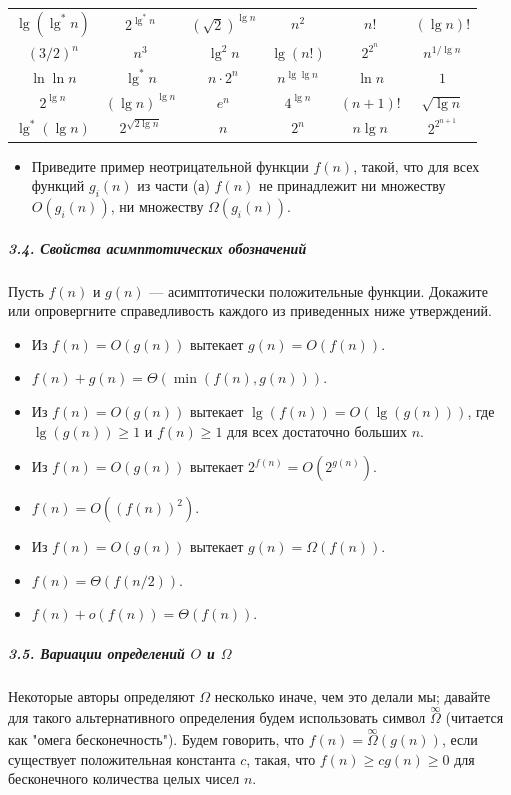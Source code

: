 \begin{center}
\begin{tabular}{cccccc}
$\lg(\lg^* n)$ & $2^{\lg^* n}$ & $(\sqrt{2})^{\lg n}$ & $n^2$ & $n!$ & $(\lg n)!$ \\
$(3/2)^n$ & $n^3$ & $\lg^2 n$ & $\lg(n!)$ & $2^{2^n}$ & $n^{1/\lg n}$ \\
$\ln \ln n$ & $\lg^* n$ & $n \cdot 2^n$ & $n^{\lg \lg n}$ & $\ln n$ & $1$ \\
$2^{\lg n}$ & $(\lg n)^{\lg n}$ & $e^n$ & $4^{\lg n}$ & $(n+1)!$ & $\sqrt{\lg n}$ \\
$\lg^*(\lg n)$ & $2^{\sqrt{2 \lg n}}$ & $n$ & $2^n$ & $n \lg n$ & $2^{2^{n+1}}$
\end{tabular}
\end{center}

\begin{itemize}
    \item[б.] Приведите пример неотрицательной функции $f(n)$, такой, что для всех функций $g_i(n)$ из части (а) $f(n)$ не принадлежит ни множеству $O(g_i(n))$, ни множеству $\Omega(g_i(n))$.
\end{itemize}

\subparagraph{3.4. Свойства асимптотических обозначений}
Пусть $f(n)$ и $g(n)$ — асимптотически положительные функции. Докажите или опровергните справедливость каждого из приведенных ниже утверждений.

\begin{itemize}
    \item[а.] Из $f(n) = O(g(n))$ вытекает $g(n) = O(f(n))$.
    \item[б.] $f(n) + g(n) = \Theta(\min(f(n), g(n)))$.
    \item[в.] Из $f(n) = O(g(n))$ вытекает $\lg(f(n)) = O(\lg(g(n)))$, где $\lg(g(n)) \ge 1$ и $f(n) \ge 1$ для всех достаточно больших $n$.
    \item[г.] Из $f(n) = O(g(n))$ вытекает $2^{f(n)} = O(2^{g(n)})$.
    \item[д.] $f(n) = O((f(n))^2)$.
    \item[е.] Из $f(n) = O(g(n))$ вытекает $g(n) = \Omega(f(n))$.
    \item[ж.] $f(n) = \Theta(f(n/2))$.
    \item[з.] $f(n) + o(f(n)) = \Theta(f(n))$.
\end{itemize}

\subparagraph{3.5. Вариации определений $O$ и $\Omega$}
Некоторые авторы определяют $\Omega$ несколько иначе, чем это делали мы; давайте для такого альтернативного определения будем использовать символ $\overset{\infty}{\Omega}$ (читается как "омега бесконечность"). Будем говорить, что $f(n) = \overset{\infty}{\Omega}(g(n))$, если существует положительная константа $c$, такая, что $f(n) \ge cg(n) \ge 0$ для бесконечного количества целых чисел $n$.

